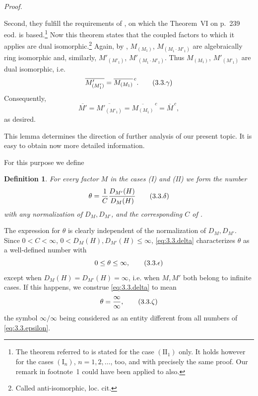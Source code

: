 \documentclass[b5paper,twoside]{article}
\theoremstyle{mvnplain}
\newtheorem{definition}{Definition}[section]
\renewenvironment{proof}[1][Proof]{%
  \par\addvspace{0.35\baselineskip}%
  \noindent\textit{#1.}\ \normalfont\ignorespaces
}{%
  \par\addvspace{0.35\baselineskip}%
}
\newcommand{\M}{\mathbf M}
\newcommand{\Hilbert}{\mathfrak H}
\def\M{M}%
\def\Hilbert{H}%
\def\mathfrak#1{#1}%
\begin{document}
\begin{proof}
Second, they fulfill the requirements of \cite[p.~235, beginning of
\S4.1]{ref6}, on which the Theorem~VI on p.~239 eod. is based.\footnote{\hypertarget{fn:21}{}The
theorem referred to is stated for the case \((\mathrm {II}_1)\) only. It holds
however for the cases \((\mathrm I_n)\), \(n=1,2,\ldots\), too, and with
precisely the same proof. Our remark in footnote~1 could have been applied to
\cite{ref6} also.} Now this theorem states that the coupled factors to which it
applies are dual isomorphic.\footnote{\hypertarget{fn:22}{}Called anti-isomorphic, loc. cit.} Again,
by \cite[p.~188, Lemma~11.4.1]{ref5},
\(\M_{(\mathfrak M_1)}\),
\(\M_{(\mathfrak M_1\cdot\mathfrak M'_1)}\) are algebraically ring
isomorphic and, similarly,
\(\M'_{(\mathfrak M'_1)}\),
\(\M'_{(\mathfrak M_1\cdot\mathfrak M'_1)}\). Thus
\(\M_{(\mathfrak M_1)}\), \(\M'_{(\mathfrak M'_1)}\) are dual isomorphic,
i.e.
\begin{equation}
  \overline{\M'_{(\mathfrak M'_1)}}
  =\overline{\M_{(\mathfrak M_1)}}^{\,c}.
  \tag{3.3.\ensuremath{\gamma}}\label{eq:3.3.gamma}
\end{equation}
Consequently,
\[
  \overline{\M'}
  =\overline{\M'_{(\mathfrak M'_1)}}
  =\overline{\M_{(\mathfrak M_1)}}^{\,c}
  =\overline{\M}^{\,c},
\]
as desired.
\end{proof}

This lemma determines the direction of further analysis of our present topic.
It is easy to obtain now more detailed information.

For this purpose we define

\begin{definition}\label{def:3.3.1}
For every factor \(\M\) in the cases (I) and (II) we form the number
\begin{equation}
  \theta=\frac{1}{C}\frac{D_{\M'}(\Hilbert)}{D_{\M}(\Hilbert)}
  \tag{3.3.\ensuremath{\delta}}\label{eq:3.3.delta}
\end{equation}
with any normalization of \(D_{\M},D_{\M'}\), and the corresponding \(C\)
of \cite[p.~182, Theorem~X]{ref5}.
\end{definition}

The expression for \(\theta\) is clearly independent of the normalization of
\(D_{\M},D_{\M'}\). Since
\(0<C<\infty\), \(0<D_{\M}(\Hilbert),D_{\M'}(\Hilbert)\leq\infty\),
\eqref{eq:3.3.delta} characterizes \(\theta\) as a well-defined number with
\begin{equation}
  0\leq\theta\leq\infty,
  \tag{3.3.\ensuremath{\epsilon}}\label{eq:3.3.epsilon}
\end{equation}
except when \(D_{\M}(\Hilbert)=D_{\M'}(\Hilbert)=\infty\), i.e. when
\(\M,\M'\) both belong to infinite cases. If this happens, we construe
\eqref{eq:3.3.delta} to mean
\begin{equation}
  \theta=\frac{\infty}{\infty},
  \tag{3.3.\ensuremath{\zeta}}\label{eq:3.3.zeta}
\end{equation}
the symbol \(\infty/\infty\) being considered as an entity different from all
numbers of \eqref{eq:3.3.epsilon}.
\end{document}
